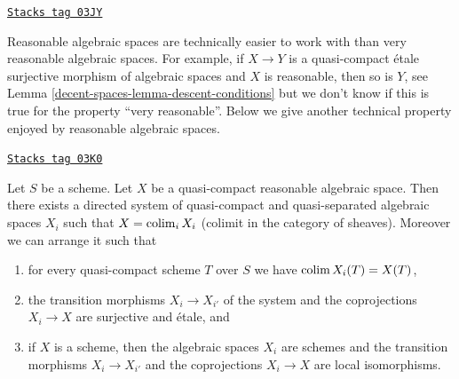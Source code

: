 \begin{remark}[Reasonable]
\label{decent-spaces-remark-reasonable}
\href{https://stacks.math.columbia.edu/tag/03JY}{\texttt{Stacks tag 03JY}}

Reasonable algebraic spaces are technically easier to work with than very
reasonable algebraic spaces. For example, if $X \to Y$ is a quasi-compact
\'etale surjective morphism of algebraic spaces and $X$ is reasonable, then
so is $Y$, see
Lemma \ref{decent-spaces-lemma-descent-conditions}
but we don't know if this is true for the property ``very reasonable''.
Below we give another technical property enjoyed by reasonable
algebraic spaces.
\end{remark}

\begin{lemma}
\label{decent-spaces-lemma-fun-property-reasonable}
\href{https://stacks.math.columbia.edu/tag/03K0}{\texttt{Stacks tag 03K0}}

Let $S$ be a scheme.
Let $X$ be a quasi-compact reasonable algebraic space.
Then there exists a directed system of quasi-compact and quasi-separated
algebraic spaces $X_i$ such that $X = \operatorname{colim}_i X_i$
(colimit in the category of sheaves). Moreover we can arrange it such that
\begin{enumerate}
\item for every quasi-compact scheme $T$ over $S$ we have
$\operatorname{colim} X_i(T) = X(T)$,
\item the transition morphisms $X_i \to X_{i'}$ of the system
and the coprojections $X_i \to X$ are surjective and \'etale, and
\item if $X$ is a scheme, then the algebraic spaces $X_i$ are schemes
and the transition morphisms $X_i \to X_{i'}$
and the coprojections $X_i \to X$ are local isomorphisms.
\end{enumerate}
\end{lemma}

